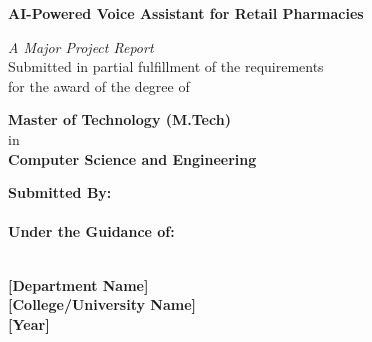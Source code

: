 \documentclass[12pt,a4paper]{report}
\begin{document}
\begin{titlepage}
    \begin{center}
        \vspace*{1cm}
        
        \Huge
        \textbf{AI-Powered Voice Assistant for Retail Pharmacies}
        
        \vspace{1.5cm}
        \Large
        \textit{A Major Project Report} \\
        \vspace{0.5cm}
        Submitted in partial fulfillment of the requirements \\
        for the award of the degree of
        
        \vspace{1.5cm}
        \textbf{Master of Technology (M.Tech)} \\
        \vspace{0.5cm}
        in \\
        \textbf{Computer Science and Engineering}
        
        \vspace{2cm}
        \textbf{Submitted By:} \\
        [Student Name] \\
        [Roll Number / Registration Number]
        
        \vspace{1.5cm}
        \textbf{Under the Guidance of:} \\
        [Guide Name] \\
        [Guide Designation]
        
        \vfill
        
        
        \vspace{0.8cm}
        \Large
        \textbf{[Department Name]} \\
        \textbf{[College/University Name]} \\
        \textbf{[Year]}
        
    \end{center}
\end{titlepage}

\end{document}
